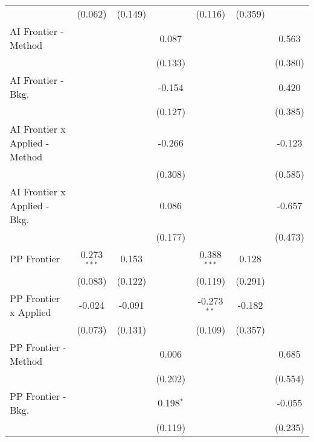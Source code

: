 \begin{tabular}{lcccccc}
                                  & (0.062)       & (0.149)       &             & (0.116)       & (0.359) &   \\   
   AI Frontier - Method           &               &               & 0.087       &               &         & 0.563\\   
                                  &               &               & (0.133)     &               &         & (0.380)\\   
   AI Frontier - Bkg.             &               &               & -0.154      &               &         & 0.420\\   
                                  &               &               & (0.127)     &               &         & (0.385)\\   
   AI Frontier x Applied - Method &               &               & -0.266      &               &         & -0.123\\   
                                  &               &               & (0.308)     &               &         & (0.585)\\   
   AI Frontier x Applied - Bkg.   &               &               & 0.086       &               &         & -0.657\\   
                                  &               &               & (0.177)     &               &         & (0.473)\\   
   PP Frontier                    & 0.273$^{***}$ & 0.153         &             & 0.388$^{***}$ & 0.128   &   \\   
                                  & (0.083)       & (0.122)       &             & (0.119)       & (0.291) &   \\   
   PP Frontier x Applied          & -0.024        & -0.091        &             & -0.273$^{**}$ & -0.182  &   \\   
                                  & (0.073)       & (0.131)       &             & (0.109)       & (0.357) &   \\   
   PP Frontier - Method           &               &               & 0.006       &               &         & 0.685\\   
                                  &               &               & (0.202)     &               &         & (0.554)\\   
   PP Frontier - Bkg.             &               &               & 0.198$^{*}$ &               &         & -0.055\\   
                                  &               &               & (0.119)     &               &         & (0.235)\\   

\end{tabular}
